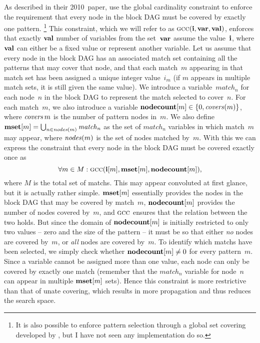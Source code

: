 As described in their 2010~paper, \citeauthor{FlochEtAl:2010} use the \gls{global
  cardinality constraint} to enforce the requirement that every \gls{node} in
the \gls{block DAG} must be covered by exactly one \gls{pattern}.\!%
%
\footnote{%
  It is also possible to enforce \gls{pattern selection} through a global set
  covering developed by \textcite{Mouthuy:2007}, but I have not seen any
  implementation do so.%
}
%
%
This \gls{constraint}, which we will refer to as \mbox{$\mGCC(\mVar{i},
  \mVar{var}, \mVar{val})$}, enforces that exactly $\mVar{val}$ number of
\glspl{variable} from the set~$\mVar{var}$ assume the value~$\mVar{i}$, where
$\mVar{val}$ can either be a fixed value or represent another \gls{variable}.
%
Let us assume that every \gls{node} in the \gls{block DAG} has an associated
\gls{match set} containing all the \glspl{pattern} that may cover that
\gls{node}, and that each \gls{match}~$m$ appearing in that \gls{match set} has
been assigned a unique integer value~$i_m$ (if $m$ appears in multiple
\glspl{match set}, it is still given the same value).
%
We introduce a \gls{variable}~$\mathit{match}_n$ for each \gls{node}~$n$ in the
\gls{block DAG} to represent the \gls{match} selected to cover~$n$.
%
For each \gls{match}~$m$, we also introduce a \gls{variable}
\mbox{$\mVar{nodecount}[m] \in \mSet{0, \mCovers(m)}$}, where
\mbox{$\operatorname{\textrm{\textit{covers}}}{m}$} is the number of \gls{pattern} \glspl{node} in~$m$.
%
We also define \mbox{$\mVar{mset}[m] = \bigcup_{n \in \mFunFont{nodes}(m)}
  \mathit{match}_n$} as the set of $\mathit{match}_n$ variables in which
\gls{match}~$m$ may appear, where $\textrm{\textit{nodes}}(m)$ is the set of
\glspl{node} matched by~$m$.
%
With this we can express the \gls{constraint} that every \gls{node} in the
\gls{block DAG} must be covered exactly once as
%
\begin{displaymath}
  \forall m \in M :
  \mGCC(\mVar{i}[m], \mVar{mset}[m], \mVar{nodecount}[m]),
\end{displaymath}
%
where $M$ is the total set of \glspl{match}.
%
This may appear convoluted at first glance, but it is actually rather simple.
%
$\mVar{mset}[m]$ essentially provides the \glspl{node} in the \gls{block DAG}
that may be covered by \gls{match}~$m$, $\mVar{nodecount}[m]$ provides the
number of \glspl{node} covered by~$m$, and $\mGCC$ ensures that the relation
between the two holds.
%
But since the domain of $\mVar{nodecount}[m]$ is initially restricted to only
two values -- zero and the size of the \gls{pattern} -- it must be so that
either \emph{no} \glspl{node} are covered by~$m$, or \emph{all} \glspl{node} are
covered by~$m$.
%
To identify which \glspl{match} have been selected, we simply check whether
\mbox{$\mVar{nodecount}[m] \neq 0$} for every \gls{pattern}~$m$.
%
Since a \gls{variable} cannot be assigned more than one value, each \gls{node}
can only be covered by exactly one \gls{match} (remember that the
$\mathit{match}_n$ variable for \gls{node}~$n$ can appear in multiple
$\mVar{mset}[m]$ sets).
%
Hence this \gls{constraint} is more restrictive than that of \gls{unate
  covering}, which results in more propagation and thus reduces the search
space.

